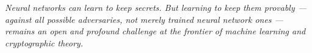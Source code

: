 \documentclass[12pt, a4paper]{article}
\begin{document}
\vspace{1.5cm}
\noindent
\begin{tcolorbox}[researchbox, title={Key Takeaway}]
  \centering\itshape
  Neural networks can learn to keep secrets. But learning to keep
  them \emph{provably} --- against all possible adversaries, not
  merely trained neural network ones --- remains an open and
  profound challenge at the frontier of machine learning and
  cryptographic theory.
\end{tcolorbox}


\newpage


\end{document}

